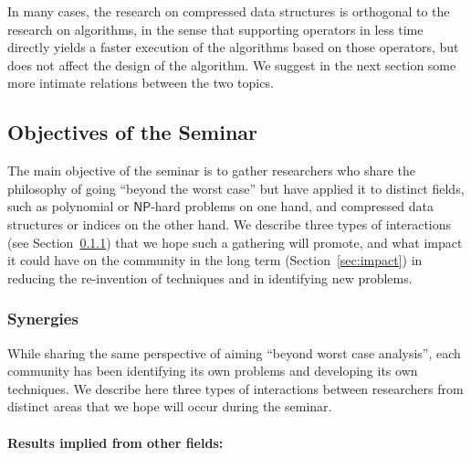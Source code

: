 \documentclass[a4paper,10pt]{article}
\newcommand{\NP}{\ensuremath{\mathsf{NP}}\xspace}
\begin{document}
In many cases, the research on compressed data structures is orthogonal to the research on algorithms, in the sense that supporting operators in less time directly yields a faster execution of the algorithms based on those operators, but does not affect the design of the algorithm. We suggest in the next section some more intimate relations between the two topics.


\subsection{Objectives of the Seminar}
\label{sec:objectives-seminar}

The main objective of the seminar is to gather researchers who share the philosophy of going ``beyond the worst case'' but have applied it to distinct fields, such as polynomial or \NP-hard problems on one hand, and compressed data structures or indices on the other hand.  We describe three types of interactions (see Section~\ref{sec:synergies}) that we hope such a gathering will promote, and what impact it could have on the community in the long term  (Section~\ref{sec:impact}) in reducing the re-invention of techniques and in identifying new problems.

\subsubsection{Synergies}
\label{sec:synergies}

While sharing the same perspective of aiming ``beyond worst case analysis'', each community has been identifying its own problems and developing its own techniques. We describe here three types of interactions between researchers from distinct areas that we hope will occur during the seminar.

\paragraph{Results implied from other fields:}
\end{document}
